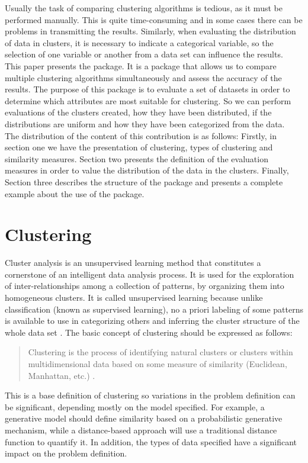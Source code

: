 Usually the task of comparing clustering algorithms is tedious, as it must be performed manually. This is quite time-consuming and in some cases there can be problems in transmitting the results. Similarly, when evaluating the distribution of data in clusters, it is necessary to indicate a categorical variable, so the selection of one variable or another from a data set can influence the results.\\
This paper presents the  package. It is a package that allows us to compare multiple clustering algorithms simultaneously and assess the accuracy of the results. The purpose of this package is to evaluate a set of datasets in order to determine which attributes are most suitable for clustering. So we can perform evaluations of the clusters created, how they have been distributed, if the distributions are uniform and how they have been categorized from the data.\\
The distribution of the content of this contribution is as follows: Firstly, in section one  we have the presentation of clustering, types of clustering and similarity measures. Section two  presents the definition of the evaluation measures in order to value the distribution of the data in the clusters. Finally, Section three  describes the structure of the package and presents a complete example about the use of the package.

\section{Clustering} \label{sec:seccion1}

Cluster analysis is an unsupervised learning method that constitutes a cornerstone of an intelligent data analysis process. It is used for the exploration of inter-relationships among a collection of patterns, by organizing them into homogeneous clusters. It is called unsupervised learning because unlike classification (known as supervised learning), no a priori labeling of some patterns is available to use in categorizing others and inferring the cluster structure of the whole data set \citep{b17}. The basic concept of clustering should be expressed as follows:
\\
\begin{quote}
Clustering is the process of identifying natural clusters or clusters within multidimensional data based on some measure of similarity (Euclidean, Manhattan, etc.) \citep{b18}.
\end{quote}
This is a base definition of clustering so variations in the problem definition can be significant, depending mostly on the model specified. For example, a generative model should define similarity based on a probabilistic generative mechanism, while a distance-based approach will use a traditional distance function to quantify it. In addition, the types of data specified have a significant impact on the problem definition.

